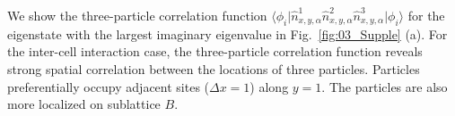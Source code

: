 \documentclass[longbibliography, aps, prx, amsmath, amssymb, amsfonts, twocolumn,superscriptaddress, footinbib]{revtex4-1}
\begin{document}
	We show the three-particle correlation function $\langle \phi_i \vert \hat{n}^1_{x,y,\alpha} \hat{n}^2_{x,y,\alpha} \hat{n}^3_{x,y,\alpha} \vert \phi_i \rangle$ for the eigenstate with the largest imaginary eigenvalue in Fig.~\ref{fig:03_Supple} (a). 
	For the inter-cell interaction case, the three-particle correlation function reveals strong spatial correlation between the locations of three particles. Particles preferentially occupy adjacent sites ($\Delta x =1$) along $y=1$. The particles are also more localized on sublattice $B$. 

\end{document}
